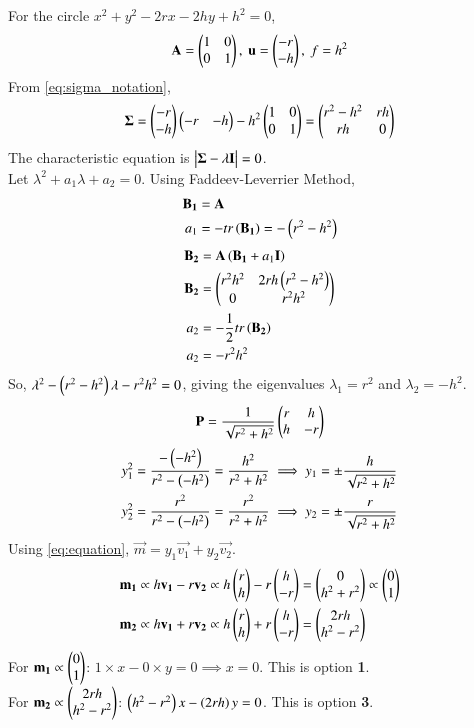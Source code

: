 \documentclass[journal]{IEEEtran}
\begin{document}
For the circle $x^2+y^2-2rx-2hy+h^2=0$,
\begin{align}
    \mathbf{A} = \begin{pmatrix}1 & 0 \\ 0 & 1\end{pmatrix},\text{ }\mathbf{u} = \begin{pmatrix}-r \\ -h\end{pmatrix},\text{ }f = h^2
\end{align}
From \eqref{eq:sigma_notation},
\begin{align}
    \mathbf{\Sigma} = \begin{pmatrix}-r \\ -h\end{pmatrix}\begin{pmatrix}-r & -h\end{pmatrix} - h^2\begin{pmatrix}1 & 0 \\ 0 & 1\end{pmatrix} = \begin{pmatrix}r^2-h^2 & rh \\ rh & 0\end{pmatrix}
\end{align}
The characteristic equation is $\begin{vmatrix}\mathbf{\Sigma}-\lambda\mathbf{I}\end{vmatrix}=0$. \\
Let $\lambda^2 + a_1 \lambda + a_2 = 0$. Using Faddeev-Leverrier Method,
\begin{align}
    \mathbf{B_1} &= \mathbf{A} \\
    a_1 &= - tr\left(\mathbf{B_1}\right) = -\left(r^2-h^2\right)
\end{align}
\begin{align}
    \mathbf{B_2} &= \mathbf{A}\left(\mathbf{B_1} + a_1\mathbf{I}\right) \\
    \mathbf{B_2} &= \begin{pmatrix}r^2h^2 & 2rh\left(r^2-h^2\right) \\ 0 & r^2h^2\end{pmatrix} \\
    a_2 &= -\frac{1}{2}tr\left(\mathbf{B_2}\right) \\
    a_2 &= -r^2h^2
\end{align}
So, $\lambda^2 - \left(r^2-h^2\right)\lambda - r^2h^2 = 0$, giving the eigenvalues $\lambda_1 = r^2$ and $\lambda_2 = -h^2$.
\begin{align}
    \mathbf{P} = \frac{1}{\sqrt{r^2+h^2}}\begin{pmatrix}r & h \\ h & -r\end{pmatrix}
\end{align}
\begin{align}
    y_1^2 = \frac{-\left(-h^2\right)}{r^2-\left(-h^2\right)} = \frac{h^2}{r^2+h^2} \implies y_1 = \pm\frac{h}{\sqrt{r^2+h^2}} \\
    y_2^2 = \frac{r^2}{r^2-\left(-h^2\right)} = \frac{r^2}{r^2+h^2} \implies y_2 = \pm\frac{r}{\sqrt{r^2+h^2}}
\end{align}
Using \eqref{eq:equation}, $\vec{m} = y_1\vec{v_1}+y_2\vec{v_2}$.
\begin{align}
    \mathbf{m_1} &\propto h\mathbf{v_1} - r\mathbf{v_2} \propto h\begin{pmatrix}r \\ h\end{pmatrix} - r\begin{pmatrix}h \\ -r\end{pmatrix} = \begin{pmatrix}0 \\ h^2+r^2\end{pmatrix} \propto \begin{pmatrix}0 \\ 1\end{pmatrix} \\
    \mathbf{m_2} &\propto h\mathbf{v_1} + r\mathbf{v_2} \propto h\begin{pmatrix}r \\ h\end{pmatrix} + r\begin{pmatrix}h \\ -r\end{pmatrix} = \begin{pmatrix}2rh \\ h^2-r^2\end{pmatrix}
\end{align}
For $\mathbf{m_1} \propto \begin{pmatrix}0 \\ 1\end{pmatrix}$: $1 \times x - 0 \times y = 0 \implies x = 0$. This is option \textbf{1}. \\
For $\mathbf{m_2} \propto \begin{pmatrix}2rh \\ h^2-r^2\end{pmatrix}$: $\left(h^2-r^2\right)x - \left(2rh\right)y = 0$. This is option \textbf{3}.
\end{document}
